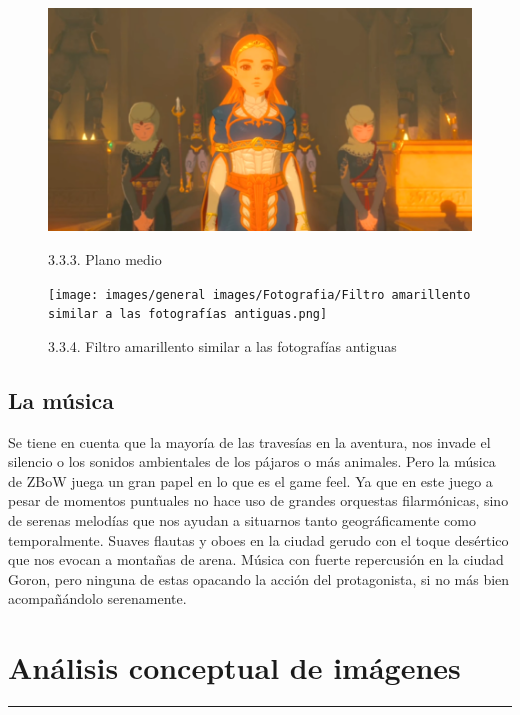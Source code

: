 \documentclass[12pt]{article}
\begin{document}
\begin{figure}[H]
  \centering
  \begin{minipage}{0.4\textwidth}
    \includegraphics[width=\textwidth]{images/general images/Fotografia/Plano medio.png}
    \caption{3.3.3. Plano medio}
  \end{minipage}
  \hfill
  \begin{minipage}{0.4\textwidth}
    \texttt{[image: images/general images/Fotografia/Filtro amarillento similar a las fotografías antiguas.png]}
    \caption{3.3.4. Filtro amarillento similar a las fotografías antiguas}
  \end{minipage}
\end{figure}



\subsection{La música}
Se tiene en cuenta que la mayoría de las travesías en la aventura, nos invade el silencio o los sonidos ambientales de los pájaros o más animales. Pero la música de ZBoW juega un gran papel en lo que es el game feel. Ya que en este juego a pesar de momentos puntuales no hace uso de grandes orquestas filarmónicas, sino de serenas melodías que nos ayudan a situarnos tanto geográficamente como temporalmente. Suaves flautas y oboes en la ciudad gerudo con el toque desértico que nos evocan a montañas de arena. Música con fuerte repercusión en la ciudad Goron, pero ninguna de estas opacando la acción del protagonista, si no más bien acompañándolo serenamente.


\newpage
\section{Análisis conceptual de imágenes}
    \hrule
\vspace{1cm}
\end{document}
